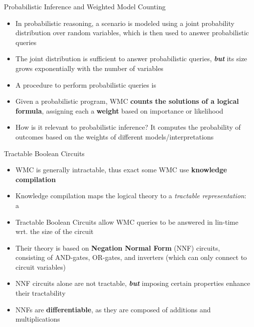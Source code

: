 \documentclass[10pt, aspectratio=169]{beamer}
\begin{document}
\begin{frame}{Probabilistic Inference and Weighted Model Counting}
    \begin{itemize}
        \setlength{\itemsep}{11pt}
        \item In probabilistic reasoning, a scenario is modeled using a joint probability distribution over random variables, which is then used to answer probabilistic queries %
        \item The joint distribution is sufficient to answer probabilistic queries, \textbf{\textit{but}} its size grows exponentially with the number of variables
        \item A procedure to perform probabilistic queries is 
        \item Given a probabilistic program, WMC \textbf{counts the solutions of a logical formula}, assigning each a \textbf{weight} based on importance or likelihood
        \item \textcolor{umBlueLighter}{How is it relevant to probabilistic inference?} It computes the probability of outcomes based on the weights of different models/interpretations
    \end{itemize}
\end{frame}

\begin{frame}{Tractable Boolean Circuits}
    \begin{itemize}
        \setlength{\itemsep}{12pt}
        \item WMC is generally intractable, thus exact some WMC use \textbf{knowledge compilation}
        \item Knowledge compilation maps the logical theory to a \textit{tractable representation}: a 
        \item \textcolor{umBlueLighter}{Tractable Boolean Circuits} allow WMC queries to be answered in lin-time wrt. the size of the circuit 
        \item Their theory is based on \textbf{Negation Normal Form} (NNF) circuits, consisting of AND-gates, OR-gates, and inverters (which can only connect to circuit variables)
        \item  NNF circuits alone are not tractable, \textbf{\textit{but}} imposing certain properties enhance their tractability
        \item NNFs are \textbf{differentiable}, as they are composed of additions and multiplications
    \end{itemize}
\end{frame}
\end{document}
